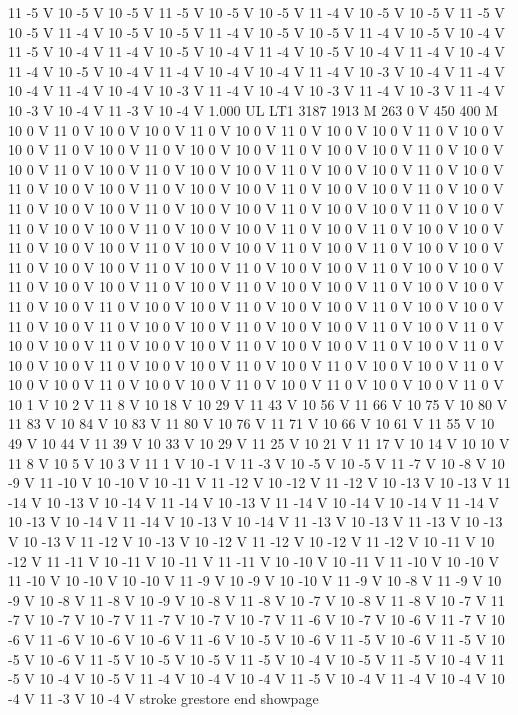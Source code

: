 {11 -5 V
10 -5 V
10 -5 V
11 -5 V
10 -5 V
10 -5 V
11 -4 V
10 -5 V
10 -5 V
11 -5 V
10 -5 V
11 -4 V
10 -5 V
10 -5 V
11 -4 V
10 -5 V
10 -5 V
11 -4 V
10 -5 V
10 -4 V
11 -5 V
10 -4 V
11 -4 V
10 -5 V
10 -4 V
11 -4 V
10 -5 V
10 -4 V
11 -4 V
10 -4 V
11 -4 V
10 -5 V
10 -4 V
11 -4 V
10 -4 V
10 -4 V
11 -4 V
10 -3 V
10 -4 V
11 -4 V
10 -4 V
11 -4 V
10 -4 V
10 -3 V
11 -4 V
10 -4 V
10 -3 V
11 -4 V
10 -3 V
11 -4 V
10 -3 V
10 -4 V
11 -3 V
10 -4 V
1.000 UL
LT1
3187 1913 M
263 0 V
450 400 M
10 0 V
11 0 V
10 0 V
10 0 V
11 0 V
10 0 V
11 0 V
10 0 V
10 0 V
11 0 V
10 0 V
10 0 V
11 0 V
10 0 V
11 0 V
10 0 V
10 0 V
11 0 V
10 0 V
10 0 V
11 0 V
10 0 V
10 0 V
11 0 V
10 0 V
11 0 V
10 0 V
10 0 V
11 0 V
10 0 V
10 0 V
11 0 V
10 0 V
11 0 V
10 0 V
10 0 V
11 0 V
10 0 V
10 0 V
11 0 V
10 0 V
10 0 V
11 0 V
10 0 V
11 0 V
10 0 V
10 0 V
11 0 V
10 0 V
10 0 V
11 0 V
10 0 V
10 0 V
11 0 V
10 0 V
11 0 V
10 0 V
10 0 V
11 0 V
10 0 V
10 0 V
11 0 V
10 0 V
11 0 V
10 0 V
10 0 V
11 0 V
10 0 V
10 0 V
11 0 V
10 0 V
10 0 V
11 0 V
10 0 V
11 0 V
10 0 V
10 0 V
11 0 V
10 0 V
10 0 V
11 0 V
10 0 V
11 0 V
10 0 V
10 0 V
11 0 V
10 0 V
10 0 V
11 0 V
10 0 V
10 0 V
11 0 V
10 0 V
11 0 V
10 0 V
10 0 V
11 0 V
10 0 V
10 0 V
11 0 V
10 0 V
11 0 V
10 0 V
10 0 V
11 0 V
10 0 V
10 0 V
11 0 V
10 0 V
10 0 V
11 0 V
10 0 V
11 0 V
10 0 V
10 0 V
11 0 V
10 0 V
10 0 V
11 0 V
10 0 V
11 0 V
10 0 V
10 0 V
11 0 V
10 0 V
10 0 V
11 0 V
10 0 V
10 0 V
11 0 V
10 0 V
11 0 V
10 0 V
10 0 V
11 0 V
10 0 V
10 0 V
11 0 V
10 0 V
11 0 V
10 0 V
10 0 V
11 0 V
10 0 V
10 0 V
11 0 V
10 0 V
10 0 V
11 0 V
10 0 V
11 0 V
10 0 V
10 0 V
11 0 V
10 1 V
10 2 V
11 8 V
10 18 V
10 29 V
11 43 V
10 56 V
11 66 V
10 75 V
10 80 V
11 83 V
10 84 V
10 83 V
11 80 V
10 76 V
11 71 V
10 66 V
10 61 V
11 55 V
10 49 V
10 44 V
11 39 V
10 33 V
10 29 V
11 25 V
10 21 V
11 17 V
10 14 V
10 10 V
11 8 V
10 5 V
10 3 V
11 1 V
10 -1 V
11 -3 V
10 -5 V
10 -5 V
11 -7 V
10 -8 V
10 -9 V
11 -10 V
10 -10 V
10 -11 V
11 -12 V
10 -12 V
11 -12 V
10 -13 V
10 -13 V
11 -14 V
10 -13 V
10 -14 V
11 -14 V
10 -13 V
11 -14 V
10 -14 V
10 -14 V
11 -14 V
10 -13 V
10 -14 V
11 -14 V
10 -13 V
10 -14 V
11 -13 V
10 -13 V
11 -13 V
10 -13 V
10 -13 V
11 -12 V
10 -13 V
10 -12 V
11 -12 V
10 -12 V
11 -12 V
10 -11 V
10 -12 V
11 -11 V
10 -11 V
10 -11 V
11 -11 V
10 -10 V
10 -11 V
11 -10 V
10 -10 V
11 -10 V
10 -10 V
10 -10 V
11 -9 V
10 -9 V
10 -10 V
11 -9 V
10 -8 V
11 -9 V
10 -9 V
10 -8 V
11 -8 V
10 -9 V
10 -8 V
11 -8 V
10 -7 V
10 -8 V
11 -8 V
10 -7 V
11 -7 V
10 -7 V
10 -7 V
11 -7 V
10 -7 V
10 -7 V
11 -6 V
10 -7 V
10 -6 V
11 -7 V
10 -6 V
11 -6 V
10 -6 V
10 -6 V
11 -6 V
10 -5 V
10 -6 V
11 -5 V
10 -6 V
11 -5 V
10 -5 V
10 -6 V
11 -5 V
10 -5 V
10 -5 V
11 -5 V
10 -4 V
10 -5 V
11 -5 V
10 -4 V
11 -5 V
10 -4 V
10 -5 V
11 -4 V
10 -4 V
10 -4 V
11 -5 V
10 -4 V
11 -4 V
10 -4 V
10 -4 V
11 -3 V
10 -4 V
stroke
grestore
end
showpage
}
